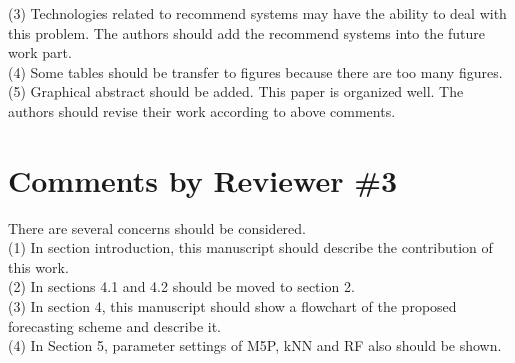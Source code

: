 \documentclass[preprint]{elsarticle}
\begin{document}
\noindent (3) Technologies related to recommend systems may have the ability to deal with this problem. The authors should add the recommend systems into the future work part.\\

\noindent (4) Some tables should be transfer to figures because there are too many figures.\\

\noindent (5) Graphical abstract should be added.
This paper is organized well. The authors should revise their work according to above comments.\\

\section{Comments by Reviewer \#3}

\noindent There are several concerns should be considered. \\

\noindent (1) In section introduction, this manuscript should describe the contribution of this work.\\

\noindent (2) In sections 4.1 and 4.2 should be moved to section 2.\\

\noindent (3) In section 4, this manuscript should show a flowchart of the proposed forecasting scheme and describe it.\\

\noindent (4) In Section 5, parameter settings of M5P, kNN and RF also should be shown.
\end{document}
